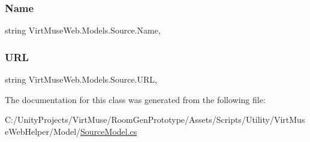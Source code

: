 \subsubsection{\texorpdfstring{Name}{Name}}
{\footnotesize\ttfamily string Virt\+Muse\+Web.\+Models.\+Source.\+Name\hspace{0.3cm}{\ttfamily [get]}, {\ttfamily [set]}}

\mbox{\label{class_virt_muse_web_1_1_models_1_1_source_a93f4b8e4e4c0997a2bcecb7e40b40f82}} 
\subsubsection{\texorpdfstring{U\+RL}{URL}}
{\footnotesize\ttfamily string Virt\+Muse\+Web.\+Models.\+Source.\+U\+RL\hspace{0.3cm}{\ttfamily [get]}, {\ttfamily [set]}}



The documentation for this class was generated from the following file\+:\begin{DoxyCompactItemize}
\item 
C\+:/\+Unity\+Projects/\+Virt\+Muse/\+Room\+Gen\+Prototype/\+Assets/\+Scripts/\+Utility/\+Virt\+Muse\+Web\+Helper/\+Model/\mbox{\hyperlink{_source_model_8cs}{Source\+Model.\+cs}}\end{DoxyCompactItemize}
